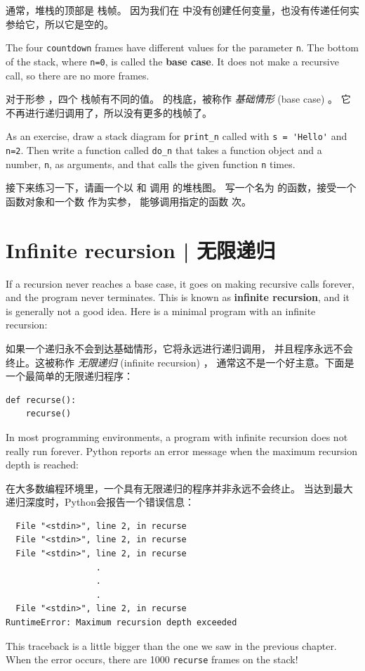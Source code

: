 {{{{通常，堆栈的顶部是  栈帧。
因为我们在  中没有创建任何变量，也没有传递任何实参给它，所以它是空的。

The four {\tt countdown} frames have different values for the
parameter {\tt n}.  The bottom of the stack, where {\tt n=0}, is
called the {\bf base case}.  It does not make a recursive call, so
there are no more frames.

对于形参  ，四个  栈帧有不同的值。  的栈底，被称作 {\em 基础情形} (base case) 。
它不再进行递归调用了，所以没有更多的栈帧了。

As an exercise, draw a stack diagram for \verb"print_n" called with
\verb"s = 'Hello'" and {\tt n=2}.
Then write a function called \verb"do_n" that takes a function
object and a number, {\tt n}, as arguments, and that calls
the given function {\tt n} times.

接下来练习一下，请画一个以  和  调用  的堆栈图。
写一个名为  的函数，接受一个函数对象和一个数  作为实参，
能够调用指定的函数  次。


\section{Infinite recursion  |  无限递归}
  
  

If a recursion never reaches a base case, it goes on making
recursive calls forever, and the program never terminates.  This is
known as {\bf infinite recursion}, and it is generally not
a good idea.  Here is a minimal program with an infinite recursion:

如果一个递归永不会到达基础情形，它将永远进行递归调用，
并且程序永远不会终止。这被称作 {\em 无限递归} (infinite recursion) ，
通常这不是一个好主意。下面是一个最简单的无限递归程序：

\begin{lstlisting}
def recurse():
    recurse()
\end{lstlisting}
%
In most programming environments, a program with infinite recursion
does not really run forever.  Python reports an error
message when the maximum recursion depth is reached:

在大多数编程环境里，一个具有无限递归的程序并非永远不会终止。
当达到最大递归深度时，Python会报告一个错误信息：
  

\begin{lstlisting}
  File "<stdin>", line 2, in recurse
  File "<stdin>", line 2, in recurse
  File "<stdin>", line 2, in recurse
                  .
                  .
                  .
  File "<stdin>", line 2, in recurse
RuntimeError: Maximum recursion depth exceeded
\end{lstlisting}
%
This traceback is a little bigger than the one we saw in the
previous chapter.  When the error occurs, there are 1000
{\tt recurse} frames on the stack!

}}}}
